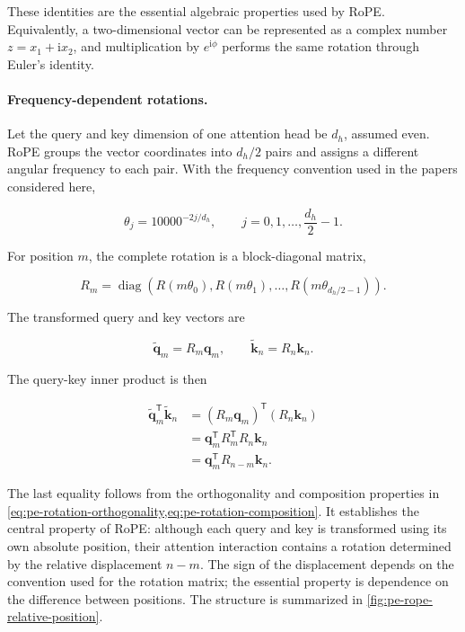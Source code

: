 These identities are the essential algebraic properties used by RoPE.
Equivalently, a two-dimensional vector can be represented as a complex
number \(z=x_1+\mathrm{i}x_2\), and multiplication by
\(e^{\mathrm{i}\phi}\) performs the same rotation through Euler's identity.

\paragraph{Frequency-dependent rotations.}
Let the query and key dimension of one attention head be \(d_h\), assumed
even. RoPE groups the vector coordinates into \(d_h/2\) pairs and assigns
a different angular frequency to each pair. With the frequency convention
used in the papers considered here,

\begin{equation}
    \theta_j=10000^{-2j/d_h},
    \qquad
    j=0,1,\ldots,\frac{d_h}{2}-1.
    \label{eq:pe-rope-frequencies}
\end{equation}

For position \(m\), the complete rotation is a block-diagonal matrix,

\begin{equation}
    R_m=
    \operatorname{diag}
    \left(
        R(m\theta_0),
        R(m\theta_1),
        \ldots,
        R(m\theta_{d_h/2-1})
    \right).
    \label{eq:pe-rope-block-rotation}
\end{equation}

The transformed query and key vectors are

\begin{equation}
    \widetilde{\mathbf{q}}_m=R_m\mathbf{q}_m,
    \qquad
    \widetilde{\mathbf{k}}_n=R_n\mathbf{k}_n.
    \label{eq:pe-rope-qk}
\end{equation}

The query-key inner product is then

\begin{align}
    \widetilde{\mathbf{q}}_m^{\mathsf T}
    \widetilde{\mathbf{k}}_n
    &=
    (R_m\mathbf{q}_m)^{\mathsf T}
    (R_n\mathbf{k}_n)\\
    &=
    \mathbf{q}_m^{\mathsf T}
    R_m^{\mathsf T}R_n
    \mathbf{k}_n\\
    &=
    \mathbf{q}_m^{\mathsf T}
    R_{n-m}
    \mathbf{k}_n.
    \label{eq:pe-rope-relative-inner-product}
\end{align}

The last equality follows from the orthogonality and composition
properties in \cref{eq:pe-rotation-orthogonality,eq:pe-rotation-composition}.
It establishes the central property of RoPE: although each query and key
is transformed using its own absolute position, their attention
interaction contains a rotation determined by the relative displacement
\(n-m\). The sign of the displacement depends on the convention used for
the rotation matrix; the essential property is dependence on the difference
between positions. The structure is summarized in
\cref{fig:pe-rope-relative-position}.

